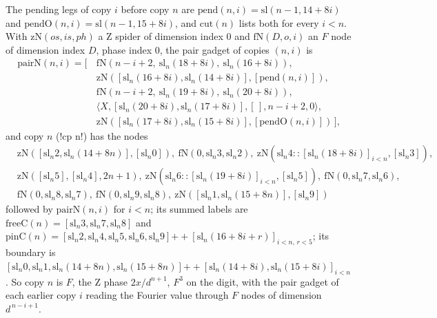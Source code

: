 {\begin{definition}[Copy $n$]\label{def:boxes-fca-cp}
The pending legs of copy $i$ before copy $n$ are $\mathrm{pend}(n,i)=\mathrm{sl}(n-1,14+8i)$ and $\mathrm{pendO}(n,i)=\mathrm{sl}(n-1,15+8i)$, and $\mathrm{cut}(n)$ lists both for every $i<n$. With $\mathrm{zN}(os,is,ph)$ a Z spider of dimension index $0$ and $\mathrm{fN}(D,o,i)$ an $F$ node of dimension index $D$, phase index $0$, the pair gadget of copies $(n,i)$ is
\begin{align*}
\mathrm{pairN}(n,i)=[\,&\mathrm{fN}(n-i+2,\ \mathrm{sl}_n(18+8i),\ \mathrm{sl}_n(16+8i)),\\
&\mathrm{zN}([\mathrm{sl}_n(16+8i),\mathrm{sl}_n(14+8i)],[\mathrm{pend}(n,i)]),\\
&\mathrm{fN}(n-i+2,\ \mathrm{sl}_n(19+8i),\ \mathrm{sl}_n(20+8i)),\\
&\langle X,[\mathrm{sl}_n(20+8i),\mathrm{sl}_n(17+8i)],[\,],n-i+2,0\rangle,\\
&\mathrm{zN}([\mathrm{sl}_n(17+8i),\mathrm{sl}_n(15+8i)],[\mathrm{pendO}(n,i)])\,],
\end{align*}
and copy $n$ (\lbx!cp n!) has the nodes
\[
\begin{aligned}
&\mathrm{zN}([\mathrm{sl}_n2,\mathrm{sl}_n(14+8n)],[\mathrm{sl}_n0]),\ \mathrm{fN}(0,\mathrm{sl}_n3,\mathrm{sl}_n2),\ \mathrm{zN}(\mathrm{sl}_n4\mathbin{::}[\mathrm{sl}_n(18+8i)]_{i<n},[\mathrm{sl}_n3]),\\
&\mathrm{zN}([\mathrm{sl}_n5],[\mathrm{sl}_n4],2n+1),\ \mathrm{zN}(\mathrm{sl}_n6\mathbin{::}[\mathrm{sl}_n(19+8i)]_{i<n},[\mathrm{sl}_n5]),\ \mathrm{fN}(0,\mathrm{sl}_n7,\mathrm{sl}_n6),\\
&\mathrm{fN}(0,\mathrm{sl}_n8,\mathrm{sl}_n7),\ \mathrm{fN}(0,\mathrm{sl}_n9,\mathrm{sl}_n8),\ \mathrm{zN}([\mathrm{sl}_n1,\mathrm{sl}_n(15+8n)],[\mathrm{sl}_n9])
\end{aligned}
\]
followed by $\mathrm{pairN}(n,i)$ for $i<n$; its summed labels are $\mathrm{freeC}(n)=[\mathrm{sl}_n3,\mathrm{sl}_n7,\mathrm{sl}_n8]$ and $\mathrm{pinC}(n)=[\mathrm{sl}_n2,\mathrm{sl}_n4,\mathrm{sl}_n5,\mathrm{sl}_n6,\mathrm{sl}_n9]\mathbin{+\!\!+}[\mathrm{sl}_n(16+8i+r)]_{i<n,\,r<5}$; its boundary is $[\mathrm{sl}_n0,\mathrm{sl}_n1,\mathrm{sl}_n(14+8n),\mathrm{sl}_n(15+8n)]\mathbin{+\!\!+}[\mathrm{sl}_n(14+8i),\mathrm{sl}_n(15+8i)]_{i<n}$. So copy $n$ is $F$, the Z phase $2x/d^{n+1}$, $F^3$ on the digit, with the pair gadget of each earlier copy $i$ reading the Fourier value through $F$ nodes of dimension $d^{\,n-i+1}$.
\end{definition}

}
